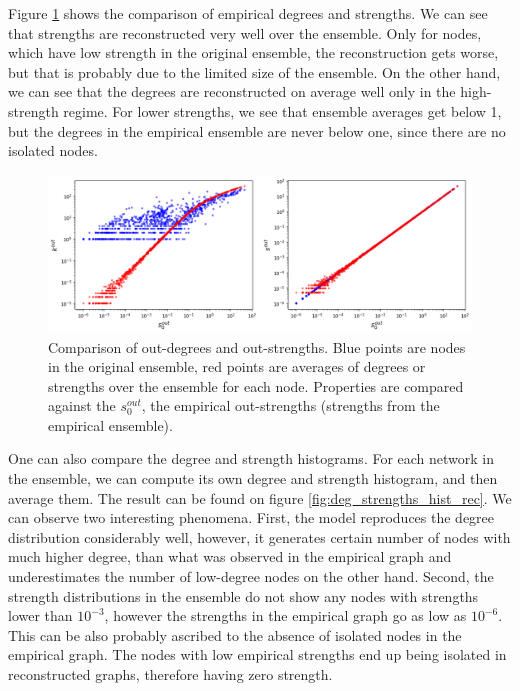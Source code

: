 Figure \ref*{fig:deg_strengths_rec} shows the comparison of empirical degrees and strengths. We can see that strengths are reconstructed very well over the ensemble. Only for nodes, which have low strength in the original ensemble, the reconstruction gets worse, but that is probably due to the limited size of the ensemble. On the other hand, we can see that the degrees are reconstructed on average well only in the high-strength regime. For lower strengths, we see that ensemble averages get below 1, but the degrees in the empirical ensemble are never below one, since there are no isolated nodes.

\begin{figure}[!ht]
    \centering
    \includegraphics[scale=0.5]{../img/vanilla_SIM/deg_strengths_rec.png}
    \caption{Comparison of out-degrees and out-strengths. Blue points are nodes in the original ensemble, red points are averages of degrees or strengths over the ensemble for each node. Properties are compared against the $s_0^{out}$, the empirical out-strengths (strengths from the empirical ensemble).}
    \label{fig:deg_strengths_rec}
\end{figure}

One can also compare the degree and strength histograms. For each network in the ensemble, we can compute its own degree and strength histogram, and then average them. The result can be found on figure \ref*{fig:deg_strengths_hist_rec}. We can observe two interesting phenomena. First, the model reproduces the degree distribution considerably well, however, it generates certain number of nodes with much higher degree, than what was observed in the empirical graph and underestimates the number of low-degree nodes on the other hand. Second, the strength distributions in the ensemble do not show any nodes with strengths lower than $10^{-3}$, however the strengths in the empirical graph go as low as $10^{-6}$. This can be also probably ascribed to the absence of isolated nodes in the empirical graph. The nodes with low empirical strengths end up being isolated in reconstructed graphs, therefore having zero strength.

